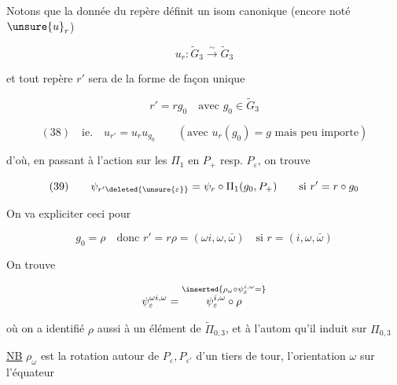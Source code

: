Notons que la donnée du repère  définit un isom canonique
(encore noté ${\unsure{u}}_r$)


\[u_r:\widetilde G_3\xrightarrow{\sim}\widetilde G_3\]

et tout repère $r'$  sera de la forme de façon unique

\[r'=rg_0\quad\text{avec }g_0\in\widetilde G_3\]

\[(38)\quad\text{ie.}\quad u_{r'}=u_ru_{g_0}\qquad(\text{avec }u_r(g_0)=g\text{ mais peu importe})\]

d'où, en passant à l'action sur les $\Pi_1$ en $P_+$ resp. $P_\varepsilon$, on trouve

\[(39)\qquad\psi_{r'\deleted{\unsure{\varepsilon}}}=\psi_r\circ\Pi_1(g_0,P_+)\qquad\text{si }r'=r\circ g_0\]


On va expliciter ceci pour

\[g_0=\rho\quad\text{donc }r'=r\rho=(\omega i,\omega,\bar\omega)\quad\text{si }r=(i,\omega,\bar\omega)\]

On trouve

\[\psi_\varepsilon^{\omega i,\omega}=\overset{\inserted{\rho_\omega\circ\psi_\varepsilon^{i,\omega}=}}{\psi_\varepsilon^{i,\omega}\circ\rho}\]

où on a identifié $\rho$ aussi à un élément de $\widetilde\Pi_{0,3}$, et à l'autom qu'il induit sur $\Pi_{0,3}$

\uline{NB} $\rho_\omega$ est la rotation autour de $P_\varepsilon,P_{\varepsilon'}$ d'un tiers de tour,  l'orientation $\omega$ sur l'équateur


